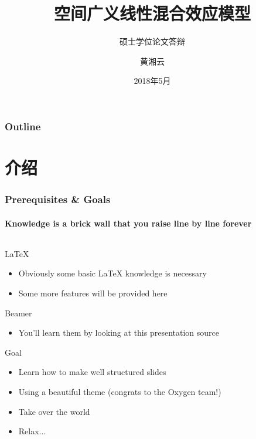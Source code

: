 \documentclass[aspectratio=43,11pt,unknownkeysallowed,UTF8]{beamer}
\title{空间广义线性混合效应模型}
\subtitle{硕士学位论文答辩}
\author{黄湘云}
\institute[CUMTB]{ 计算数学与统计系\\ 理学院}
\date{2018年5月}
\begin{document}
\begin{frame}
  \vskip-5.45cm
\titlepage
\end{frame}


\begin{frame}
  \frametitle{Outline}
  \tableofcontents
\end{frame}



\section{介绍}

\begin{frame}
  \frametitle{Prerequisites \& Goals}
  \framesubtitle{Knowledge is a brick wall that you raise line by line forever}
 \begin{columns}
  \begin{column}{11cm}
   \begin{block}{LaTeX}
   \begin{itemize}
     \item Obviously some basic LaTeX knowledge is necessary
     \item Some more features will be provided here
   \end{itemize}
   \end{block}

   \begin{block}{Beamer}
   \begin{itemize}
     \item You'll learn them by looking at this presentation source
   \end{itemize}
   \end{block}

   \begin{block}{Goal}
   \begin{itemize}
     \item Learn how to make well structured slides
     \item Using a beautiful theme (congrats to the Oxygen team!)
     \item Take over the world
     \item Relax...
   \end{itemize}
   \end{block}
  \end{column}
 \end{columns}
\end{frame}
\end{document}
